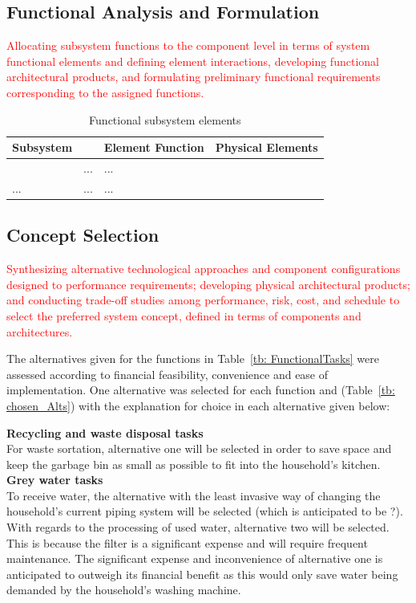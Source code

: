 \documentclass[a4paper,11pt,fleqn]{report}
\begin{document}
\subsection{Functional Analysis and Formulation} 
\textcolor{red}{Allocating subsystem functions to the component level in terms of system functional elements and defining element interactions, developing functional architectural products, and formulating preliminary functional requirements corresponding to the assigned functions.}
%
\begin{table}[h!]
\caption {Functional subsystem elements} \label{tb: Functional_SS_elements} 
\begin{center}
\begin{tabular}{p{4cm}|p{4cm}|p{4cm}|p{4cm}}\toprule
	{\textbf{Subsystem}} & {\textbf{Class function} & {\textbf{Element Function}} & {\textbf{Physical Elements}}\\ \midrule
    \textcolor{Format used by sample project} & ... & ...\\
    \hline
    ... & ... & ...\\

    \bottomrule
\end{tabular}
\end{center}
\end{table}
%
\subsection{Concept Selection}
\textcolor{red}{Synthesizing alternative technological approaches and component configurations designed to performance requirements; developing physical architectural products; and conducting trade-off studies among performance, risk, cost, and schedule to select the preferred system concept, defined in terms of components and architectures.}

The alternatives given for the functions in Table~\ref{tb: FunctionalTasks} were assessed according to financial feasibility, convenience and ease of implementation. One alternative was selected for each function and (Table~\ref{tb: chosen_Alts}) with the explanation for choice in each alternative given below:

\textbf{Recycling and waste disposal tasks}\\
For waste sortation, alternative one will be selected in order to save space and keep the garbage bin as small as possible to fit into the household's kitchen.\\

\textbf{Grey water tasks}\\
To receive water, the alternative with the least invasive way of changing the household's current piping system will be selected (which is anticipated to be ?). With regards to the processing of used water, alternative two will be selected. This is because the filter is a significant expense and will require frequent maintenance. The significant expense and inconvenience of alternative one is anticipated to outweigh its financial benefit as this would only save water being demanded by the household's washing machine.\\
\end{document}
